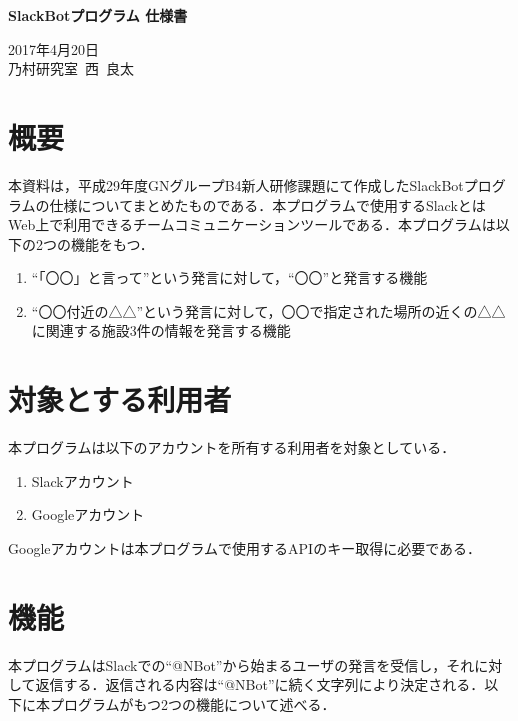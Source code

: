 \documentclass[fleqn, 14pt]{extarticlej}
\begin{document}
\begin{center}
{\Large {\bf SlackBotプログラム 仕様書}}

\end{center}

\begin{flushright}
  2017年4月20日\\
  
  乃村研究室\ 西\ 良太
\end{flushright}

\section{概要}
本資料は，平成29年度GNグループB4新人研修課題にて作成したSlackBotプログラムの仕様についてまとめたものである．本プログラムで使用するSlack\cite{Slack}とはWeb上で利用できるチームコミュニケーションツールである．本プログラムは以下の2つの機能をもつ．

\begin{enumerate}
\item ``「〇〇」と言って''という発言に対して，``〇〇''と発言する機能
\item ``〇〇付近の△△''という発言に対して，〇〇で指定された場所の近くの△△に関連する施設3件の情報を発言する機能
\end{enumerate}

\section{対象とする利用者}
本プログラムは以下のアカウントを所有する利用者を対象としている．

\begin{enumerate}
\item Slackアカウント
\item Googleアカウント
\end{enumerate}

Googleアカウントは本プログラムで使用するAPIのキー取得に必要である．

\section{機能}
本プログラムはSlackでの``@NBot''から始まるユーザの発言を受信し，それに対して返信する．返信される内容は``@NBot''に続く文字列により決定される．以下に本プログラムがもつ2つの機能について述べる．
\end{document}
